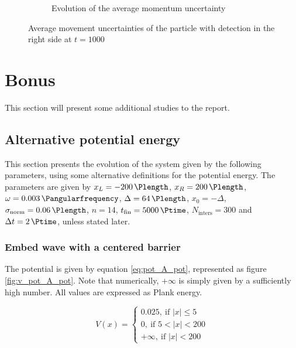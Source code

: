 \documentclass[a4paper,12pt,twoside]{article}
\begin{document}
\begin{figure}[h]
\begin{subfigure}[t]{0.45\textwidth}
          \caption{Evolution of the average momentum uncertainty}
          \label{fig:iv_det_delp}
        \end{subfigure}
        \caption{Average movement uncertainties of the particle with detection in the right side at $t=1000$}
        \label{fig:iv_det_del}
\end{figure}


\newpage
\section{Bonus}
  This section will present some additional studies to the report.\\

  \subsection{Alternative potential energy}
    This section presents the evolution of the system given by the following parameters, using some alternative definitions for the potential energy.
    The parameters are given by $x_L=\SI{-200}{\Plength}$, $x_R=\SI{200}{\Plength}$, $\omega = \SI{0.003}{\Pangularfrequency}$, $\Delta = \SI{64}{\Plength}$, $x_0 = -\Delta$, $\sigma_\text{norm} = \SI{0.06}{\Plength}$, $n=14$, $t_\text{fin} = \SI{5000}{\Ptime}$, $N_\text{inters} = 300$ and $\Delta t = \SI{2}{\Ptime}$, unless stated later.\\

      \subsubsection{Embed wave with a centered barrier}
        The potential is given by equation \eqref{eq:pot_A_pot}, represented as figure \ref{fig:v_pot_A_pot}.
        Note that numerically, $+\infty$ is simply given by a sufficiently high number.
        All values are expressed as Plank energy.

        \begin{equation}
          V(x) =
          \begin{cases}
            0.025,~\text{if $|x| \leq 5$}\\
            0,~\text{if $5 < |x| < 200$}\\
            +\infty,~\text{if $|x| < 200$}
          \end{cases}
          \label{eq:pot_A_pot}
        \end{equation}
\end{document}
